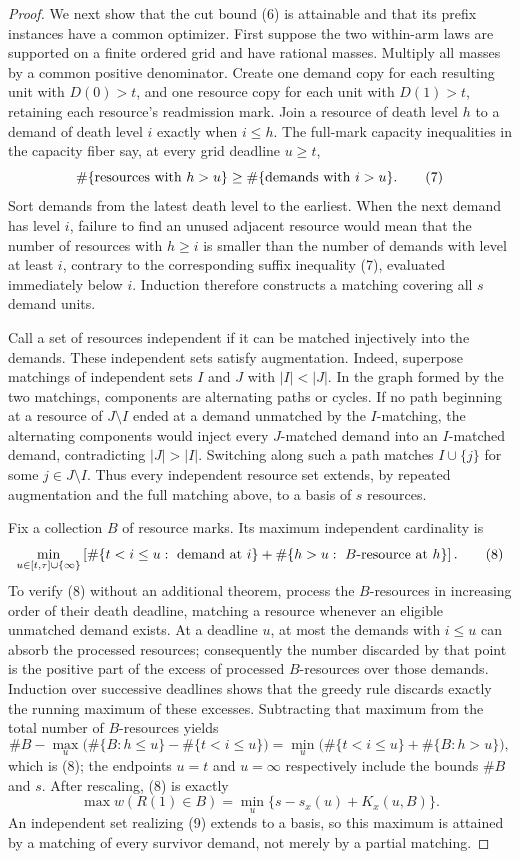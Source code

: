 \documentclass{article}
\begin{document}
\begin{proof}
We next show that the cut bound (6) is attainable and that its prefix instances have a common optimizer.  First suppose the two within-arm laws are supported on a finite ordered grid and have rational masses.  Multiply all masses by a common positive denominator.  Create one demand copy for each resulting unit with \(D(0)>t\), and one resource copy for each unit with \(D(1)>t\), retaining each resource's readmission mark.  Join a resource of death level \(h\) to a demand of death level \(i\) exactly when \(i\leq h\).  The full-mark capacity inequalities in the capacity fiber say, at every grid deadline \(u\geq t\),
\[
\#\{\hbox{resources with }h>u\}
\geq \#\{\hbox{demands with }i>u\}. \tag{7}
\]
Sort demands from the latest death level to the earliest.  When the next demand has level \(i\), failure to find an unused adjacent resource would mean that the number of resources with \(h\geq i\) is smaller than the number of demands with level at least \(i\), contrary to the corresponding suffix inequality (7), evaluated immediately below \(i\).  Induction therefore constructs a matching covering all \(s\) demand units.

Call a set of resources independent if it can be matched injectively into the demands.  These independent sets satisfy augmentation.  Indeed, superpose matchings of independent sets \(I\) and \(J\) with \(|I|<|J|\).  In the graph formed by the two matchings, components are alternating paths or cycles.  If no path beginning at a resource of \(J\setminus I\) ended at a demand unmatched by the \(I\)-matching, the alternating components would inject every \(J\)-matched demand into an \(I\)-matched demand, contradicting \(|J|>|I|\).  Switching along such a path matches \(I\cup\{j\}\) for some \(j\in J\setminus I\).  Thus every independent resource set extends, by repeated augmentation and the full matching above, to a basis of \(s\) resources.

Fix a collection \(B\) of resource marks.  Its maximum independent cardinality is
\[
\min_{u\in[t,\tau]\cup\{\infty\}}
\left[
\#\{t<i\leq u:\hbox{ demand at }i\}
+\#\{h>u:\hbox{ \(B\)-resource at }h\}
\right]. \tag{8}
\]
To verify (8) without an additional theorem, process the \(B\)-resources in increasing order of their death deadline, matching a resource whenever an eligible unmatched demand exists.  At a deadline \(u\), at most the demands with \(i\leq u\) can absorb the processed resources; consequently the number discarded by that point is the positive part of the excess of processed \(B\)-resources over those demands.  Induction over successive deadlines shows that the greedy rule discards exactly the running maximum of these excesses.  Subtracting that maximum from the total number of \(B\)-resources yields
\[
\#B-\max_u
\bigl(\#\{B:h\leq u\}-\#\{t<i\leq u\}\bigr)
=\min_u
\bigl(\#\{t<i\leq u\}+\#\{B:h>u\}\bigr),
\]
which is (8); the endpoints \(u=t\) and \(u=\infty\) respectively include the bounds \(\#B\) and \(s\).  After rescaling, (8) is exactly
\[
\max w(R(1)\in B)
=\min_u\{s-s_x(u)+K_x(u,B)\}. \tag{9}
\]
An independent set realizing (9) extends to a basis, so this maximum is attained by a matching of every survivor demand, not merely by a partial matching.


\end{proof}
\end{document}
